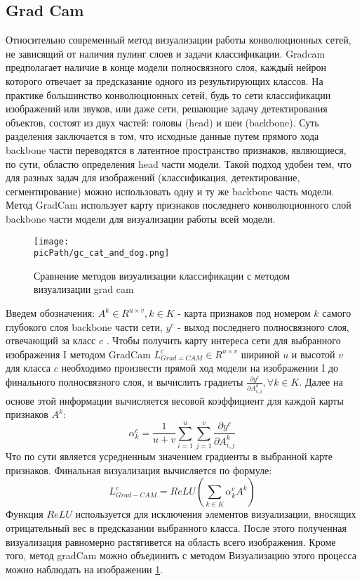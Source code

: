 \documentclass[oneside,final,14pt]{extreport}
\newcommand{\picPath}{img}
\begin{document}
\subsection{Grad Cam}
Относительно современный метод визуализации работы конволюционных сетей, не зависящий от наличия пулинг слоев и задачи классификации.  Gradcam предполагает наличие в конце модели полносвязного слоя, каждый нейрон которого отвечает за предсказание одного из результирующих классов.  На практике большинство конволюционных сетей, будь то сети классификации изображений или звуков, или даже сети, решающие задачу детектирования объектов, состоят из двух частей: головы (head) и шеи (backbone). Суть разделения заключается в том, что исходные данные путем прямого хода backbone части переводятся в латентное пространство признаков, являющиеся, по сути, областю определения head части модели. Такой подход удобен тем, что для разных задач для изображений (классификация, детектирование, сегментирование) можно использовать одну и ту же backbone часть модели. Метод GradCam использует карту признаков последнего конволюционного слой backbone части модели для визуализации работы всей модели. 
\begin{figure}[H]
\begin{center}
\texttt{[image: \\picPath/gc\_cat\_and\_dog.png]}
\end{center}
  \caption{Сравнение методов визуализации классификации с методом визуализации grad cam}
  \label{pic:gc_cat_and_dog}
\end{figure}
Введем обозначения: $A^k \in R^{u \times v}, k 
\in K$ - карта признаков под номером $k$ самого глубокого слоя backbone части сети, $y^c$ - выход последнего полносвязного слоя, отвечающий за класс $c$ . Чтобы получить карту интереса сети для выбранного изображения I методом GradCam $L_{Grad=CAM}^c \in R^{u \times v}$ шириной $u$ и высотой $v$ для класса $c$ необходимо произвести прямой ход модели на изображении I до финального полносвязного слоя, и вычислить градиеты $\frac{\partial y^c}{\partial A_{i,j}^k}, \forall k \in K$. Далее на основе этой информации вычисляется весовой коэффициент для каждой карты признаков $A^k$:
$$
\alpha_k^c  = \frac{1}{u+v}\sum_{i = 1}^u 
\sum_{j=1}^v \frac{\partial y^c}{\partial A_{i,j}^k}
$$
Что по сути является усредненным значением градиенты в выбранной карте признаков. Финальная визуализация вычисляется по формуле:
$$
L^c_{Grad-CAM} = ReLU(\sum_{k \in K} \alpha_k^c A^k)
$$
Функция $ReLU$ используется для исключения элементов визуализации, вносящих отрицательный вес в предсказании выбранного класса. После этого полученная визуализация равномерно растягивется на область всего изображения. Кроме того, метод gradCam можно объединить с  методом Визуализацию этого процесса можно наблюдать на изображении \ref{pic:gc_cat_and_dog}. 
\end{document}
